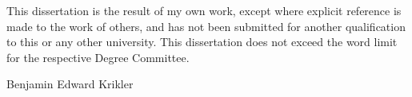 %

\begin{abstract}%
\end{abstract}

\begin{declaration}
  This dissertation is the result of my own work, except where explicit
  reference is made to the work of others, and has not been submitted
  for another qualification to this or any other university. This
  dissertation does not exceed the word limit for the respective Degree
  Committee.
  \vspace*{1cm}
  \begin{flushright}
	Benjamin Edward Krikler
  \end{flushright}
\end{declaration}


\begin{acknowledgements}
\end{acknowledgements}



\tableofcontents

